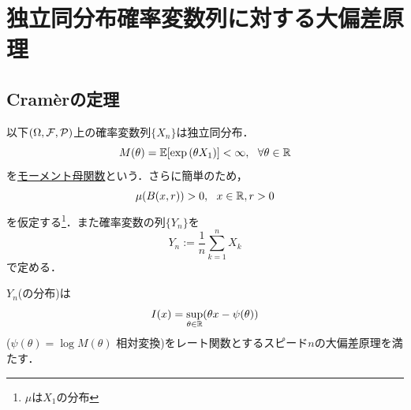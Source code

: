 \documentclass[dvipdfmx, leqno]{jsbook}
\begin{document}
\section{独立同分布確率変数列に対する大偏差原理}
\subsection{Cram\`erの定理}
    以下$(\Omega, \mathcal{F}, \mathcal{P})$上の確率変数列$\{X_n\}$は独立同分布．
\begin{equation}
    M(\theta)= \mathbb{E}[\exp{(\theta X_1)}]< \infty,\ \ \forall \theta\in \mathbb{R}
\end{equation}
    を\underline{モーメント母関数}という．さらに簡単のため，
\begin{equation}
    \mu(B(x, r))> 0,\ \ x\in \mathbb{R}, r> 0
\end{equation}
    を仮定する\footnote{$\mu$は$X_1$の分布}．また確率変数の列$\{Y_n\}$を
\begin{equation}
    Y_n:= \frac{1}{n}\sum_{k= 1}^n X_k
\end{equation}
    で定める．

    $Y_n$(の分布)は
\begin{equation}
    I(x)= \sup_{\theta\in \mathbb{R}}(\theta x- \psi(\theta))
\end{equation}
    ($\psi(\theta)= \log{M(\theta)}$ 相対変換)をレート関数とするスピード$n$の大偏差原理を満たす．
\end{document}
